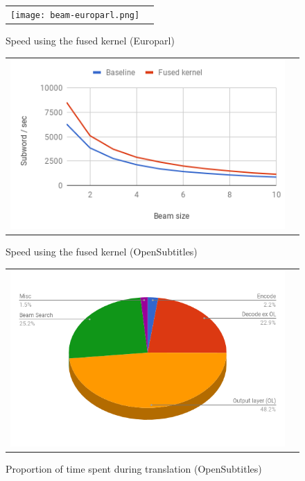 \documentclass[11pt,a4paper]{article}
\begin{document}
\begin{figure}
\centering
\begin{tabular}{cc}
{\texttt{[image: beam-europarl.png]}} 
\end{tabular}
\caption{Speed using the fused kernel (Europarl)}
\label{fig:beam-europarl}
\end{figure} 

\begin{figure}
\centering
\begin{tabular}{cc}
{\includegraphics[scale=0.5]{beam-opensubtitles.png}} 
\end{tabular}
\caption{Speed using the fused kernel (OpenSubtitles)}
\label{fig:beam-opensubtitles}
\end{figure} 

\begin{figure}
\centering
\begin{tabular}{cc}
{\includegraphics[scale=0.3]{pie-time-opensubtitles.png}} 
\end{tabular}
\caption{Proportion of time spent during translation (OpenSubtitles)}
\label{fig:pie-time-opensubtitles}
\end{figure} 
\end{document}
